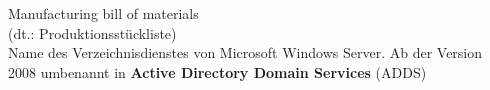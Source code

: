 
\begin{acronym}
	 Manufacturing bill of materials\\
	(dt.: Produktionsstückliste)
	\\
	Name des Verzeichnisdienstes von Microsoft Windows Server. Ab der Version 2008 umbenannt in \textbf{Active Directory Domain Services} (ADDS)
\end{acronym}